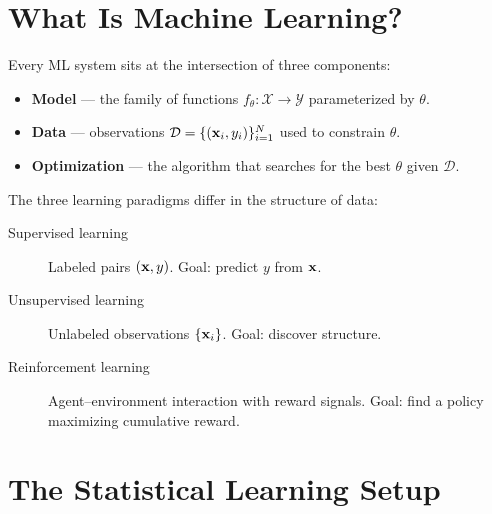 \documentclass[oneside]{book}
\begin{document}
\section{What Is Machine Learning?}


Every ML system sits at the intersection of three components:
\begin{itemize}
    \item \textbf{Model} --- the family of functions $f_\theta : \mathcal{X} \to \mathcal{Y}$ parameterized by $\theta$.
    \item \textbf{Data} --- observations $\mathcal{D} = \{(\mathbf{x}_i, y_i)\}_{i=1}^N$ used to constrain $\theta$.
    \item \textbf{Optimization} --- the algorithm that searches for the best $\theta$ given $\mathcal{D}$.
\end{itemize}

The three learning paradigms differ in the structure of data:
\begin{description}
    \item[Supervised learning] Labeled pairs $(\mathbf{x}, y)$. Goal: predict $y$ from $\mathbf{x}$.
    \item[Unsupervised learning] Unlabeled observations $\{\mathbf{x}_i\}$. Goal: discover structure.
    \item[Reinforcement learning] Agent--environment interaction with reward signals. Goal: find a policy maximizing cumulative reward.
\end{description}

\section{The Statistical Learning Setup}


\end{document}
